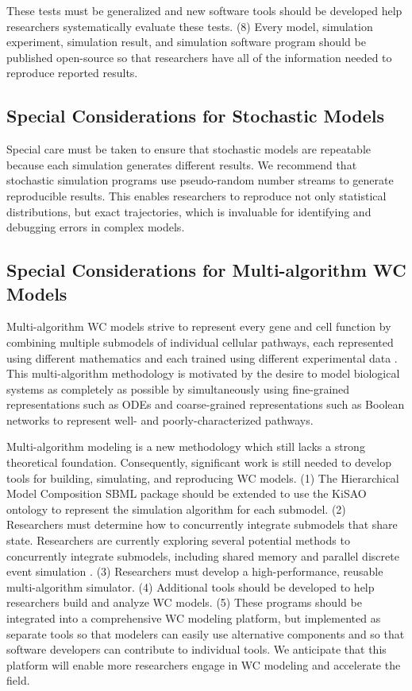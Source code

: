 \documentclass[journal,transmag,twoside]{IEEEtran}
\begin{document}
These tests must be generalized and new software tools should be developed help researchers systematically evaluate these tests. (8) Every model, simulation experiment, simulation result, and simulation software program should be published open-source so that researchers have all of the information needed to reproduce reported results.

\subsection{Special Considerations for Stochastic Models}
Special care must be taken to ensure that stochastic models are repeatable because each simulation generates different results. We recommend that stochastic simulation programs use pseudo-random number streams to generate reproducible results. This enables researchers to reproduce not only statistical distributions, but exact trajectories, which is invaluable for identifying and debugging errors in complex models.

\subsection{Special Considerations for Multi-algorithm WC Models}
Multi-algorithm WC models strive to represent every gene and cell function by combining multiple submodels of individual cellular pathways, each represented using different mathematics and each trained using different experimental data \cite{Karr2015, macklin2014future, carrera2015build}. This multi-algorithm methodology is motivated by the desire to model biological systems as completely as possible by simultaneously using fine-grained representations such as ODEs and coarse-grained representations such as Boolean networks to represent well- and poorly-characterized pathways. 

Multi-algorithm modeling is a new methodology which still lacks a strong theoretical foundation. Consequently, significant work is still needed to develop tools for building, simulating, and reproducing WC models. (1) The Hierarchical Model Composition SBML package should be extended to use the KiSAO ontology \cite{courtot2011controlled} to represent the simulation algorithm for each submodel. (2) Researchers must determine how to concurrently integrate submodels that share state. Researchers are currently exploring several potential methods to concurrently integrate submodels, including shared memory and parallel discrete event simulation \cite{Goldberg2016}. (3) Researchers must develop a high-performance, reusable multi-algorithm simulator. (4) Additional tools should be developed to help researchers build and analyze WC models. (5) These programs should be integrated into a comprehensive WC modeling platform, but implemented as separate tools so that modelers can easily use alternative components and so that software developers can contribute to individual tools. We anticipate that this platform will enable more researchers engage in WC modeling and accelerate the field.
\end{document}

